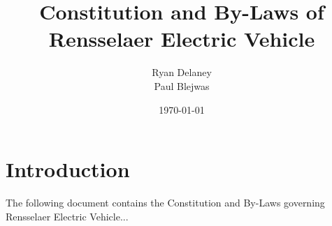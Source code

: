 \documentclass[date, maintoc, notoc]{combine}
\title{Constitution and By-Laws of Rensselaer Electric Vehicle}
\author{Ryan Delaney \\ Paul Blejwas}
\date{\today}
\begin{document}
\pagestyle{combine}
\maketitle
\newpage
\tableofcontents
\clearpage

\section{Introduction}
\label{intro}

The following document contains the Constitution and By-Laws governing Rensselaer Electric Vehicle...

\begin{papers}

\end{papers}
\clearpage
\end{document}
